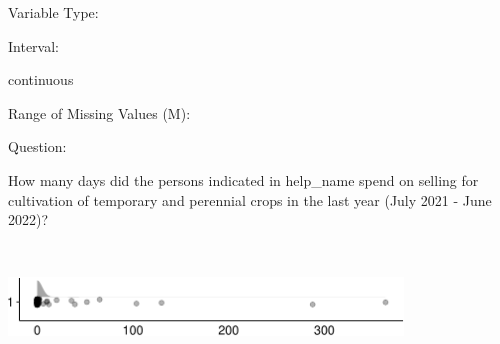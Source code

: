 \documentclass[
]{article}
\begin{document}
\begin{minipage}[t]{0.3\linewidth}

Variable Type:

\end{minipage}%
\begin{minipage}[t]{0.7\linewidth}

\end{minipage}

\begin{minipage}[t]{0.3\linewidth}

Interval:

\end{minipage}%
\begin{minipage}[t]{0.7\linewidth}

continuous

\end{minipage}

\begin{minipage}[t]{0.3\linewidth}

Range of Missing Values (M):

\end{minipage}%
\begin{minipage}[t]{0.7\linewidth}

\end{minipage}

\begin{minipage}[t]{0.3\linewidth}

Question:

\end{minipage}%
\begin{minipage}[t]{0.7\linewidth}

How many days did the persons indicated in help\_name spend on selling
for cultivation of temporary and perennial crops in the last year (July
2021 - June 2022)?

\end{minipage}

\begin{minipage}[t]{0.3\linewidth}

~

\end{minipage}%
\begin{minipage}[t]{0.7\linewidth}

\includegraphics[width=396px]{codebook_template_files/figure-latex/q7_35_rainplot-1}

\end{minipage}
 \vspace*{-6mm} 
\end{document}
